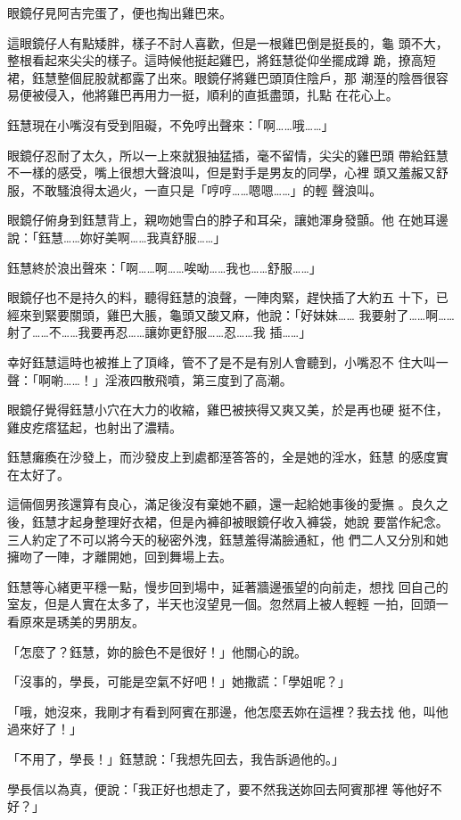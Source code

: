 眼鏡仔見阿吉完蛋了，便也掏出雞巴來。

這眼鏡仔人有點矮胖，樣子不討人喜歡，但是一根雞巴倒是挺長的，龜
頭不大，整根看起來尖尖的樣子。這時候他挺起雞巴，將鈺慧從仰坐擺成蹲
跪，撩高短裙，鈺慧整個屁股就都露了出來。眼鏡仔將雞巴頭頂住陰戶，那
潮溼的陰唇很容易便被侵入，他將雞巴再用力一挺，順利的直抵盡頭，扎點
在花心上。

鈺慧現在小嘴沒有受到阻礙，不免哼出聲來：「啊……哦……」

眼鏡仔忍耐了太久，所以一上來就狠抽猛插，毫不留情，尖尖的雞巴頭
帶給鈺慧不一樣的感受，嘴上很想大聲浪叫，但是對手是男友的同學，心裡
頭又羞赧又舒服，不敢騷浪得太過火，一直只是「哼哼……嗯嗯……」的輕
聲浪叫。

眼鏡仔俯身到鈺慧背上，親吻她雪白的脖子和耳朵，讓她渾身發顫。他
在她耳邊說：「鈺慧……妳好美啊……我真舒服……」

鈺慧終於浪出聲來：「啊……啊……唉呦……我也……舒服……」

眼鏡仔也不是持久的料，聽得鈺慧的浪聲，一陣肉緊，趕快插了大約五
十下，已經來到緊要關頭，雞巴大脹，龜頭又酸又麻，他說：「好妹妹……
我要射了……啊……射了……不……我要再忍……讓妳更舒服……忍……我
插……」

幸好鈺慧這時也被推上了頂峰，管不了是不是有別人會聽到，小嘴忍不
住大叫一聲：「啊喲……！」淫液四散飛噴，第三度到了高潮。

眼鏡仔覺得鈺慧小穴在大力的收縮，雞巴被挾得又爽又美，於是再也硬
挺不住，雞皮疙瘩猛起，也射出了濃精。

鈺慧癱瘓在沙發上，而沙發皮上到處都溼答答的，全是她的淫水，鈺慧
的感度實在太好了。

這倆個男孩還算有良心，滿足後沒有棄她不顧，還一起給她事後的愛撫
。良久之後，鈺慧才起身整理好衣裙，但是內褲卻被眼鏡仔收入褲袋，她說
要當作紀念。三人約定了不可以將今天的秘密外洩，鈺慧羞得滿臉通紅，他
們二人又分別和她擁吻了一陣，才離開她，回到舞場上去。

鈺慧等心緒更平穩一點，慢步回到場中，延著牆邊張望的向前走，想找
回自己的室友，但是人實在太多了，半天也沒望見一個。忽然肩上被人輕輕
一拍，回頭一看原來是琇美的男朋友。

「怎麼了？鈺慧，妳的臉色不是很好！」他關心的說。

「沒事的，學長，可能是空氣不好吧！」她撒謊：「學姐呢？」

「哦，她沒來，我剛才有看到阿賓在那邊，他怎麼丟妳在這裡？我去找
他，叫他過來好了！」

「不用了，學長！」鈺慧說：「我想先回去，我告訴過他的。」

學長信以為真，便說：「我正好也想走了，要不然我送妳回去阿賓那裡
等他好不好？」

